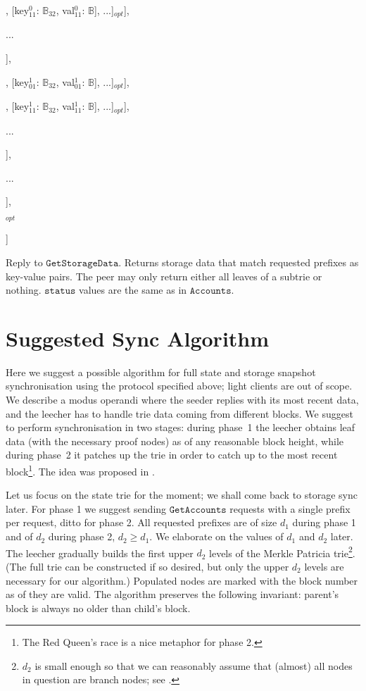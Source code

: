 \documentclass{amsart}
\begin{document}
\quad \qquad [status$^0_1$: $\mathbb{N}$, [[key$^0_{10}$: $\mathbb{B}_{32}$, val$^0_{10}$: $\mathbb{B}$], [key$^0_{11}$: $\mathbb{B}_{32}$, val$^0_{11}$: $\mathbb{B}$], ...]$_{opt}$],

\quad \qquad ...

\qquad ],

\qquad [

\quad \qquad [status$^1_0$: $\mathbb{N}$, [[key$^1_{00}$: $\mathbb{B}_{32}$, val$^1_{00}$: $\mathbb{B}$], [key$^1_{01}$: $\mathbb{B}_{32}$, val$^1_{01}$: $\mathbb{B}$], ...]$_{opt}$],

\quad \qquad [status$^1_1$: $\mathbb{N}$, [[key$^1_{10}$: $\mathbb{B}_{32}$, val$^1_{10}$: $\mathbb{B}$], [key$^1_{11}$: $\mathbb{B}_{32}$, val$^1_{11}$: $\mathbb{B}$], ...]$_{opt}$],

\quad \qquad ...

\qquad ],

\qquad ...

\quad ],

$_{opt}$

]
\medskip

Reply to $\texttt{GetStorageData}$.
Returns storage data that match requested prefixes as key-value pairs.
The peer may only return either all leaves of a subtrie or nothing.
$\texttt{status}$ values are the same as in $\texttt{Accounts}$.

\section{Suggested Sync Algorithm}

Here we suggest a possible algorithm for full state and storage snapshot synchronisation using the protocol specified above;
light clients are out of scope.
We describe a modus operandi where the seeder replies with its most recent data,
and the leecher has to handle trie data coming from different blocks.
We suggest to perform synchronisation in two stages:
during phase~1 the leecher obtains leaf data (with the necessary proof nodes) as of any reasonable block height,
while during phase~2 it patches up the trie in order to catch up to the most recent block\footnote{The
Red Queen's race is a nice metaphor for phase 2.}.
The idea was proposed in \cite{leaf_sync}.

Let us focus on the state trie for the moment; we shall come back to storage sync later.
For phase 1 we suggest sending $\texttt{GetAccounts}$ requests with a single prefix per request, ditto for phase 2.
All requested prefixes are of size $d_1$ during phase 1 and of $d_2$ during phase 2, $d_2 \geq d_1$.
We elaborate on the values of $d_1$ and $d_2$ later.
The leecher gradually builds the first upper $d_2$ levels of the Merkle Patricia trie\footnote{$d_2$
is small enough so that we can reasonably assume that (almost) all nodes in question are branch nodes;
see \cite{akhunov_1x_workshop_part2}.}.
(The full trie can be constructed if so desired, but only the upper $d_2$ levels are necessary for our algorithm.)
Populated nodes are marked with the block number as of they are valid.
The algorithm preserves the following invariant: parent's block is always no older than child's block.
\end{document}
